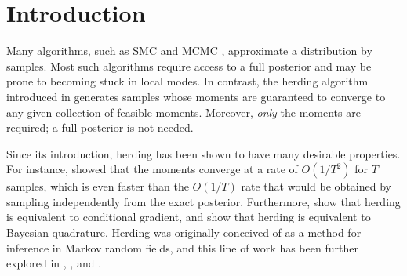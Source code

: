 \documentclass[paper.tex]{subfiles}
\begin{document}
\section{Introduction} 
\label{sec:intro}

Many algorithms, such as SMC \citep{smc} and MCMC \citep{mcmc}, approximate a 
distribution by samples. Most such algorithms require access to a full posterior and 
may be prone to becoming stuck in local modes. In contrast, the herding algorithm introduced in 
\citet{Welling:2009a} generates samples whose moments are guaranteed to converge 
to any given collection of feasible moments. Moreover, \emph{only} the moments 
are required; a full posterior is not needed.

Since its introduction, herding has been shown to have many desirable properties.
For instance, \citet{Chen:2010a} showed that the moments converge at a rate of $O(1/T^{2})$ for 
$T$ samples, which is even faster than the $O(1/T)$ rate that would be obtained 
by sampling independently from the exact posterior. Furthermore, \citet{Bach:2012a} show that herding is 
equivalent to conditional gradient, and \citet{Huszar:2012} show that 
herding is equivalent to Bayesian quadrature. Herding was originally conceived of as a method 
for inference in Markov random fields, and this line of work has been further explored in 
\citet{Welling:2009a}, \citet{Gelfand:2010}, and \citet{Bornn:2013}.
\end{document}
